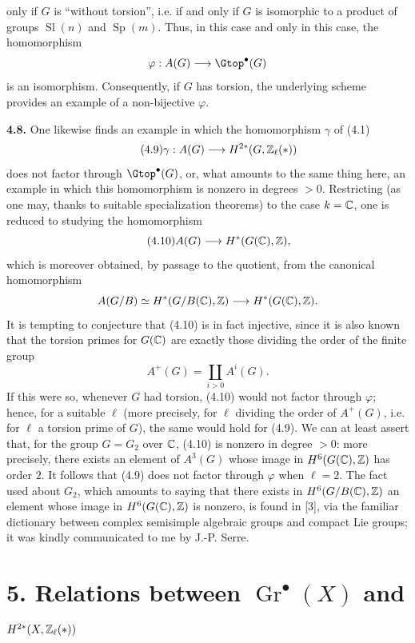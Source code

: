 only if $G$ is ``without torsion'', i.e. if and only if $G$ is isomorphic to
a product of groups $\operatorname{Sl}(n)$ and $\operatorname{Sp}(m)$. Thus,
in this case and only in this case, the homomorphism
\[
 \varphi:A(G)\longrightarrow\Gtop^\bullet(G)
\]
is an isomorphism. Consequently, if $G$ has torsion, the underlying scheme
provides an example of a non-bijective $\varphi$.

\noindent\textbf{4.8.}
One likewise finds an example in which the homomorphism $\gamma$ of (4.1)
\begin{equation}\tag{4.9}
 \gamma:A(G)\longrightarrow H^{2*}(G,\mathbb Z_\ell(*))
\end{equation}
does not factor through $\Gtop^\bullet(G)$, or, what amounts to the same
thing here, an example in which this homomorphism is nonzero in degrees
$>0$. Restricting (as one may, thanks to suitable specialization theorems)
to the case $k=\mathbb C$, one is reduced to studying the homomorphism
\begin{equation}\tag{4.10}
 A(G)\longrightarrow H^*(G(\mathbb C),\mathbb Z),
\end{equation}
which is moreover obtained, by passage to the quotient, from the canonical
homomorphism
\[
 A(G/B)\simeq H^*(G/B(\mathbb C),\mathbb Z)
 \longrightarrow H^*(G(\mathbb C),\mathbb Z).
\]
It is tempting to conjecture that (4.10) is in fact injective, since it is
also known that the torsion primes for $G(\mathbb C)$ are exactly those dividing
the order of the finite group
\[
 A^+(G)=\coprod_{i>0}A^i(G).
\]
If this were so, whenever $G$ had torsion, (4.10) would not factor through
$\varphi$; hence, for a suitable $\ell$ (more precisely, for $\ell$ dividing
the order of $A^+(G)$, i.e. for $\ell$ a torsion prime of $G$), the same
would hold for (4.9). We can at least assert that, for the group $G=G_2$
over $\mathbb C$, (4.10) is nonzero in degree $>0$: more precisely, there exists an
element of $A^3(G)$ whose image in $H^6(G(\mathbb C),\mathbb Z)$ has order $2$. It follows
that (4.9) does not factor through $\varphi$ when $\ell=2$. The fact used
about $G_2$, which amounts to saying that there exists in
$H^6(G/B(\mathbb C),\mathbb Z)$ an element whose image in $H^6(G(\mathbb C),\mathbb Z)$ is nonzero, is
found in [3], via the familiar dictionary between complex semisimple
algebraic groups and compact Lie groups; it was kindly communicated to me
by J.-P. Serre.

\section*{5. Relations between $\operatorname{Gr}^\bullet(X)$ and
$H^{2*}(X,\mathbb Z_\ell(*))$}

